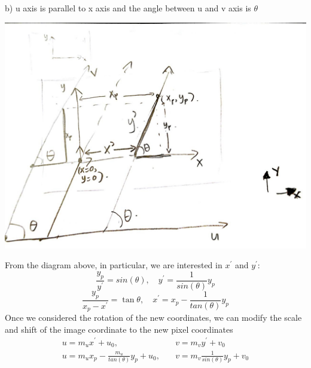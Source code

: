 \documentclass[a4paper,12pt]{article}
\begin{document}
b) u axis is parallel to x axis and the angle between u and v axis is $\theta$
\begin{center}
\includegraphics[scale=0.25]{cv_2.jpg}
\end{center}
From the diagram above, in particular, we are interested in $x^\prime$ and $y^\prime$:
$$\frac{y_p}{y^\prime} = sin(\theta), \quad y^\prime= \frac{1}{sin(\theta)}y_p$$
$$\frac{y_p}{x_p - x^\prime} = \tan \theta, \quad x^\prime = x_p - \frac{1}{tan(\theta)}y_p$$
Once we considered the rotation of the new coordinates, we can modify the scale and shift of the image coordinate to the new pixel coordinates
\begin{equation}
\begin{split}
u = m_ux^\prime + u_0, \quad \quad \quad& \quad v = m_v y^\prime + v_0\\
u = m_u x_p - \frac{m_u}{tan(\theta)}y_p + u_0, & \quad v = m_v \frac{1}{sin(\theta)}y_p + v_0
\end{split}
\end{equation}
\end{document}
